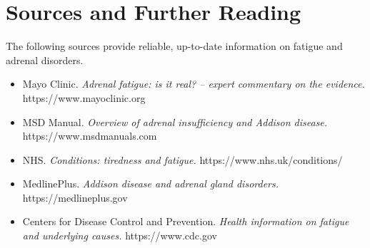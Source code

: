 \section*{Sources and Further Reading}
The following sources provide reliable, up-to-date information on fatigue and adrenal disorders.

\begin{itemize}
    \item Mayo Clinic. \textit{Adrenal fatigue: is it real? -- expert commentary on the evidence.} https://www.mayoclinic.org
    \item MSD Manual. \textit{Overview of adrenal insufficiency and Addison disease.} https://www.msdmanuals.com
    \item NHS. \textit{Conditions: tiredness and fatigue.} https://www.nhs.uk/conditions/
    \item MedlinePlus. \textit{Addison disease and adrenal gland disorders.} https://medlineplus.gov
    \item Centers for Disease Control and Prevention. \textit{Health information on fatigue and underlying causes.} https://www.cdc.gov
\end{itemize}
